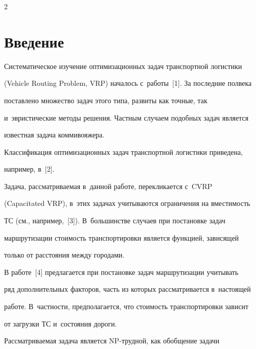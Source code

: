 \begin{multicols}{2}





\label{st\stat}





\section{Введение}





  Систематическое изучение оптимизационных задач транспортной логистики


(Vehicle Routing Problem, VRP) началось с~работы~[1]. За последние полвека


поставлено множество задач этого типа, развиты как точные, так


и~эвристические методы решения. Частным случаем подобных задач является


известная задача коммивояжера.


  Классификация оптимизационных задач транспортной логистики приведена,


например, в~[2].





  Задача, рассматриваемая в~данной работе, перекликается с~CVRP


(Capacitated VRP), в~этих задачах учитываются ограничения на вместимость


ТС (см., например,~[3]). В~большинстве случаев при постановке задач


маршрутизации стоимость транспортировки является функцией, зависящей


только от расстояния между городами.





  В работе~[4] предлагается при постановке задач маршрутизации учитывать


ряд дополнительных факторов, часть из которых рассматривается в~настоящей


работе. В~частности, предполагается, что стоимость транспортировки зависит


от загрузки ТС и~состояния дороги.





  Рассматриваемая задача является NP-труд\-ной, как обобщение задачи



\end{multicols}
